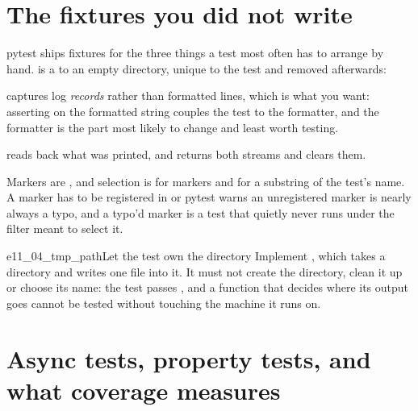 \section{The fixtures you did not write}
\label{sec:testing-builtin}

pytest ships fixtures for the three things a test most often has to arrange
by hand.  is a  to an empty directory, unique to the
test and removed afterwards:


\noindent
{} captures log \emph{records} rather than formatted lines, which
is what you want: asserting on the formatted string couples the test to the
formatter, and the formatter is the part most likely to change and least
worth testing.


\noindent
{} reads back what was printed, and  returns
both streams and clears them.


\noindent
Markers are \code{[Trait]}, and selection is  for markers and
 for a substring of the test's name. A marker has to be registered
in  or pytest warns \dash{} an unregistered marker is
nearly always a typo, and a typo'd marker is a test that quietly never runs
under the filter meant to select it.


\begin{exercise}{e11_04_tmp_path}{Let the test own the directory}
Implement , which takes a directory and writes one file
into it. It must not create the directory, clean it up or choose its name:
the test passes , and a function that decides where its output
goes cannot be tested without touching the machine it runs on.
\end{exercise}

\section{Async tests, property tests, and what coverage measures}
\label{sec:testing-async}

